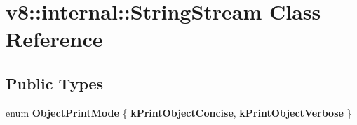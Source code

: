 \hypertarget{classv8_1_1internal_1_1StringStream}{}\section{v8\+:\+:internal\+:\+:String\+Stream Class Reference}
\label{classv8_1_1internal_1_1StringStream}
\subsection*{Public Types}
\begin{DoxyCompactItemize}
\item 
\mbox{\label{classv8_1_1internal_1_1StringStream_a361ab644103e5b93e61e9446d097195e}} 
enum {\bfseries Object\+Print\+Mode} \{ {\bfseries k\+Print\+Object\+Concise}, 
{\bfseries k\+Print\+Object\+Verbose}
 \}
\end{DoxyCompactItemize}
